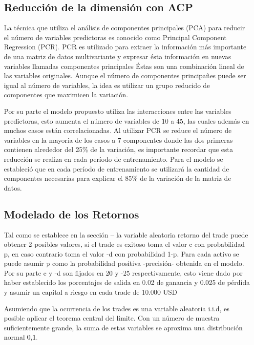 \documentclass[a4paper,12pt]{Latex/Classes/PhDthesisPSnPDF}
\begin{document}
\subsection{Reducción de la dimensión con ACP}

La técnica que utiliza el análisis de componentes principales (PCA) para reducir el número de variables predictoras es conocido como Principal Component Regression (PCR). PCR es utilizado para extraer la información más importante de una matriz de datos multivariante y expresar ésta información en nuevas variables llamadas componentes principales Éstas son una combinación lineal de las variables originales. Aunque el número de componentes principañes puede ser igual al número de variables, la idea es utilizar un grupo reducido de componentes que maximicen la variación.

Por su parte el modelo propuesto utiliza las interacciones entre las variables predictoras, esto aumenta el número de variables de 10 a 45, las cuales además en muchos casos están correlacionadas. Al utilizar PCR se reduce el número de variables en la mayoría de los casos a 7 componentes donde las dos primeras contienen alrededor del 25\% de la variación, es importante recordar que esta reducción se realiza en cada período de entrenamiento. Para el modelo se estableció que en cada período de entrenamiento se utilizará la cantidad de componentes necesarias para explicar el 85\% de la variación de la matriz de datos.

\subsection{Modelado de los Retornos}

Tal como se establece en la sección -- la variable aleatoria retorno del trade puede obtener 2 posibles valores, si el trade es exitoso toma el valor c con probabilidad p, en caso contrario toma el valor -d con probabilidad 1-p. Para cada activo se puede asumir p como la probabilidad positiva -precisión- obtenida en el modelo. Por su parte c y -d son fijados en 20 y -25 respectivamente, esto viene dado por haber establecido los porcentajes de salida en 0.02 de ganancia y 0.025 de pérdida y asumir un capital a riesgo en cada trade de 10.000 USD

Asumiendo que la ocurrencia de los trades es una variable aleatoria i.i.d, es posible aplicar el teorema central del límite. Con un número de muestra suficientemente grande, la suma de estas variables se aproxima una distribución normal 0,1.
\end{document}
